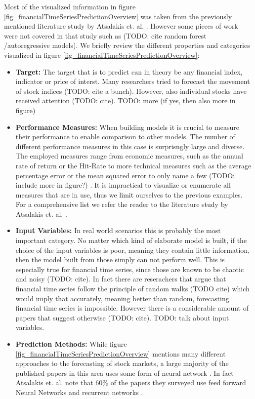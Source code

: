 Most of the visualized information in figure \ref{fig_financialTimeSeriesPredictionOverview} was taken from the previously mentioned literature study by Atsalakis et. al. \cite{atsalakis2009surveying}. However  some pieces of work were not covered in that study such as (TODO: cite random forest /autoregressive models). We briefly review the different properties and categories visualized in figure 
\ref{fig_financialTimeSeriesPredictionOverview}:

\begin{itemize}
	\item \textbf{Target:} The target that is to predict can in theory be any financial index, indicator or price of interst. Many researchers tried to forecast the movement of stock indices (TODO: cite a bunch). However, also individual stocks have received attention (TODO: cite). TODO: more (if yes, then also more in figure) 
	\item \textbf{Performance Measures:} When building models it is crucial to measure their performance to enable comparison to other models. The number of different performance measures in this case is surprisngly large and diverse. The employed measures range from economic measures, such as the annual rate of return or the Hit-Rate to more technical measures such as the average percentage error or the mean squared error to only name a few (TODO: include more in figure?) . It is impractical to visualize or enumerate all measures that are in use, thus we limit ourselves to the previous examples. For a comprehensive list we refer the reader to the literature study by Atsalakis et. al. \cite{atsalakis2009surveying}.
	\item \textbf{Input Variables:} In real world scenarios this is probably the most important category. No matter which kind of elaborate model is built, if the choice of the input variables is poor, meaning they contain little information, then the model built from those simply can not perform well. This is especially true for financial time series, since those are known to be chaotic and noisy (TODO: cite). In fact there are reserachers that argue that financial time series follow the principle of random walks (TODO cite) which would imply that accurately, meaning better than random, forecasting financial time series is impossible. However there is a considerable amount of papers that suggest otherwise (TODO: cite). TODO: talk about input variables.
	\item \textbf{Prediction Methods:} While figure \ref{fig_financialTimeSeriesPredictionOverview} mentions many different approaches to the forecasting of stock markets, a large majority of the published papers in this area uses some form of neural network \cite{atsalakis2009surveying}. In fact Atsalakis et. al. note that 60\% of the papers they surveyed use feed forward Neural Networks and recurrent networks \cite{atsalakis2009surveying}. 
\end{itemize}


